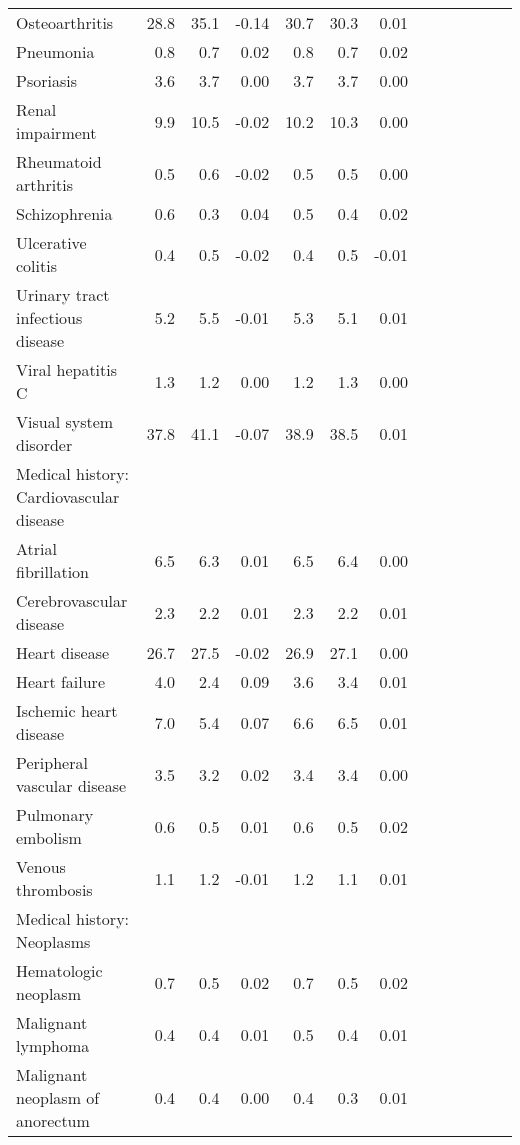 \documentclass[11pt,]{article}
\begin{document}
\begin{longtable}{lrrrrrrrrrrrr}
      Osteoarthritis & 28.8 &  35.1 & -0.14 & 30.7 &  30.3 &  0.01 \\ 
      Pneumonia &  0.8 &   0.7 &  0.02 &  0.8 &   0.7 &  0.02 \\ 
      Psoriasis &  3.6 &   3.7 &  0.00 &  3.7 &   3.7 &  0.00 \\ 
      Renal impairment &  9.9 &  10.5 & -0.02 & 10.2 &  10.3 &  0.00 \\ 
      Rheumatoid arthritis &  0.5 &   0.6 & -0.02 &  0.5 &   0.5 &  0.00 \\ 
      Schizophrenia &  0.6 &   0.3 &  0.04 &  0.5 &   0.4 &  0.02 \\ 
      Ulcerative colitis &  0.4 &   0.5 & -0.02 &  0.4 &   0.5 & -0.01 \\ 
      Urinary tract infectious disease &  5.2 &   5.5 & -0.01 &  5.3 &   5.1 &  0.01 \\ 
      Viral hepatitis C &  1.3 &   1.2 &  0.00 &  1.2 &   1.3 &  0.00 \\ 
      Visual system disorder & 37.8 &  41.1 & -0.07 & 38.9 &  38.5 &  0.01 \\ 
  Medical history: Cardiovascular disease &    &     &     &    &     &     \\ 
      Atrial fibrillation &  6.5 &   6.3 &  0.01 &  6.5 &   6.4 &  0.00 \\ 
      Cerebrovascular disease &  2.3 &   2.2 &  0.01 &  2.3 &   2.2 &  0.01 \\ 
      Heart disease & 26.7 &  27.5 & -0.02 & 26.9 &  27.1 &  0.00 \\ 
      Heart failure &  4.0 &   2.4 &  0.09 &  3.6 &   3.4 &  0.01 \\ 
      Ischemic heart disease &  7.0 &   5.4 &  0.07 &  6.6 &   6.5 &  0.01 \\ 
      Peripheral vascular disease &  3.5 &   3.2 &  0.02 &  3.4 &   3.4 &  0.00 \\ 
      Pulmonary embolism &  0.6 &   0.5 &  0.01 &  0.6 &   0.5 &  0.02 \\ 
      Venous thrombosis &  1.1 &   1.2 & -0.01 &  1.2 &   1.1 &  0.01 \\ 
  Medical history: Neoplasms &    &     &     &    &     &     \\ 
      Hematologic neoplasm &  0.7 &   0.5 &  0.02 &  0.7 &   0.5 &  0.02 \\ 
      Malignant lymphoma &  0.4 &   0.4 &  0.01 &  0.5 &   0.4 &  0.01 \\ 
      Malignant neoplasm of anorectum &  0.4 &   0.4 &  0.00 &  0.4 &   0.3 &  0.01 \\ 

\end{longtable}
\end{document}
